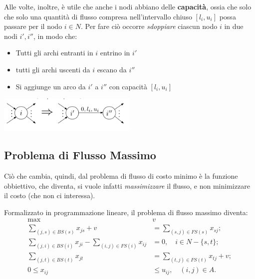 Alle volte, inoltre, è utile che anche i nodi abbiano delle \textbf{capacità}, ossia che solo che solo una quantità di flusso compresa nell’intervallo chiuso $[l_i , u_i]$ possa passare per il nodo $i \in N$. Per fare ciò occorre \textit{sdoppiare} ciascun nodo $i$ in due nodi $i',i''$, in modo che:
\begin{itemize}
  \item Tutti gli archi entranti in $i$ entrino in $i'$ 
  \item tutti gli archi uscenti da $i$ escano da $i''$
  \item Si aggiunge un arco da $i'$ a $i''$ con capacità $[l_i,u_i]$
\end{itemize}
\begin{center}
  \includegraphics[width=0.5\textwidth]{img/giga_archetto_con_capacity.png}
\end{center}

\subsection{Problema di Flusso Massimo}

Ciò che cambia, quindi, dal problema di flusso di costo minimo è la funzione obbiettivo, che diventa, si vuole infatti \textit{massimizzare} il flusso, e non minimizzare il costo (che non ci interessa). 

Formalizzato in programmazione lineare, il problema di flusso massimo diventa:
\begin{equation} \label{PL_FM}
  \begin{aligned}
  \max \quad & v \\
  \sum_{(j,s) \in BS(s)} x_{js} + v &= \sum_{(s,j) \in FS(s)} x_{sj}; \\
  \sum_{(j,i) \in BS(i)} x_{ji} - \sum_{(i,j) \in FS(i)} x_{ij} &= 0, \quad i \in N - \{s, t\}; \\
  \sum_{(j,t) \in BS(t)} x_{jt} &= \sum_{(t,j) \in FS(t)} x_{tj} + v; \\
  0 \leq x_{ij} &\leq u_{ij}, \quad (i,j) \in A.
  \end{aligned}
\end{equation}

